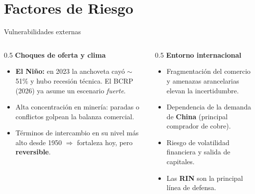 \documentclass[10pt,aspectratio=169]{beamer}
\begin{document}
\section{Factores de Riesgo}
\begin{frame}{Vulnerabilidades externas}
  \begin{columns}[T]
    \begin{column}{0.5\textwidth}
      \textbf{Choques de oferta y clima}
      \begin{itemize}\footnotesize
        \item \textbf{El Niño:} en 2023 la anchoveta cayó $\sim$51\% y hubo recesión técnica. El BCRP (2026) ya asume un escenario \emph{fuerte}.
        \item Alta concentración en minería: paradas o conflictos golpean la balanza comercial.
        \item Términos de intercambio en su nivel más alto desde 1950 $\Rightarrow$ fortaleza hoy, pero \textbf{reversible}.
      \end{itemize}
    \end{column}
    \begin{column}{0.5\textwidth}
      \textbf{Entorno internacional}
      \begin{itemize}\footnotesize
        \item Fragmentación del comercio y amenazas arancelarias elevan la incertidumbre.
        \item Dependencia de la demanda de \textbf{China} (principal comprador de cobre).
        \item Riesgo de volatilidad financiera y salida de capitales.
        \item Las \textbf{RIN} son la principal línea de defensa.
      \end{itemize}
    \end{column}
  \end{columns}
  \vfill
\end{frame}
\end{document}
